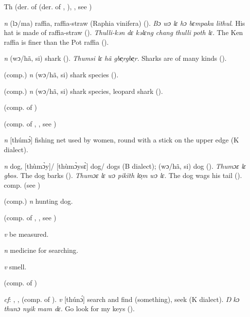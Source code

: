 \begin{letter}{Th}
 (der. of  (der. of , ), , see )

 \textit{n} (lɔ/ma) raffia, raffia-straw (Raphia vinifera) (\citealt{Pichl1967}). \textit{Bɔ wɔ lɛ hɔ bɛmpaka lithul}. His hat is made of raffia-straw (\citealt{Pichl1967}). \textit{Thulli-kən dɛ kəlɛng chang thulli poth lɛ.} The Ken raffia is finer than the Pot raffia (\citealt{Pichl1967}).

 \textit{n} (wɔ/hã, si) shark (\citealt{Pichl1967}). \textit{Thumsi lɛ hã gbe̹rgbe̹r.} Sharks are of many kinds (\citealt{Pichl1967}). 

 (comp.) \textit{n} (wɔ/hã, si) shark species (\citealt{Pichl1967}). 

 (comp.) \textit{n} (wɔ/hã, si) shark species, leopard shark (\citealt{Pichl1967}). 

 (comp. of ) 

 (comp. of , , see ) 

 \textit{n} [thúmɔ́] fishing net used by women, round with a stick on the upper edge (K dialect). 

 \textit{n} dog, [thùmɔ̀y]/ [thùmɔ̀ysɛ̀] dog/ dogs (B dialect); (wɔ/hã, si) dog (\citealt{Pichl1967}). \textit{Thumɔɛ lɛ gbos.} The dog barks (\citealt{Pichl1967}). \textit{Thumɔɛ lɛ wɔ pikïth lo̹m wɔ lɛ.} The dog wags his tail (\citealt{Pichl1967}). comp.  (see ) 

 (comp.) \textit{n} hunting dog.

 (comp. of , , see ) 

 \textit{v} be measured.

 \textit{n} medicine for searching.

 \textit{v} smell.

 (comp. of ) 

 \textit{cf}: , ,  (comp. of ). \textit{v} [thúnɔ́] search and find (something), seek (K dialect). \textit{Ŋ kɔ thunɔ nyik mam dɛ.} Go look for my keys (\citealt{Pichl1967}).


\end{letter}
